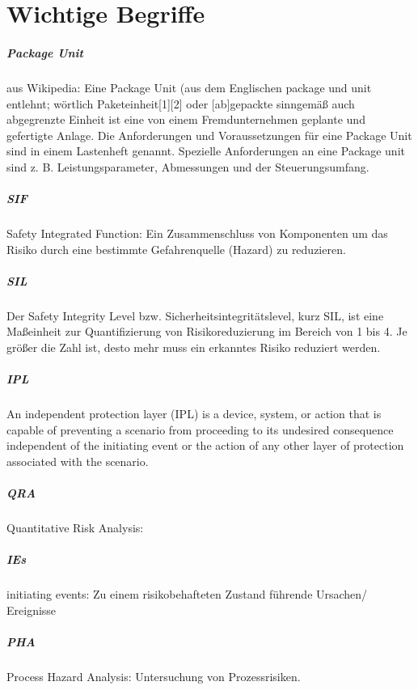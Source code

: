 \chapter{Wichtige Begriffe}
\paragraph*{Package Unit}
aus Wikipedia: \hfill \newline
Eine Package Unit (aus dem Englischen package und unit entlehnt; wörtlich Paketeinheit[1][2] oder [ab]gepackte sinngemäß auch abgegrenzte Einheit ist eine von einem Fremdunternehmen geplante und gefertigte Anlage. Die Anforderungen und Voraussetzungen für eine Package Unit sind in einem Lastenheft genannt. Spezielle Anforderungen an eine Package unit sind z. B. Leistungsparameter, Abmessungen und der Steuerungsumfang.
\paragraph*{SIF}
Safety Integrated Function: Ein Zusammenschluss von Komponenten um das Risiko durch eine bestimmte Gefahrenquelle (Hazard) zu reduzieren. 
\paragraph*{SIL}
Der Safety Integrity Level bzw. Sicherheitsintegritätslevel, kurz SIL, ist eine Ma\ss{}einheit zur Quantifizierung von Risikoreduzierung im Bereich von 1 bis 4. Je gr\"o\ss{}er die Zahl ist, desto mehr muss ein erkanntes Risiko reduziert werden. 
\paragraph*{IPL}
An independent protection layer (IPL) is a device, system, or action that is capable
of preventing a scenario from proceeding to its undesired consequence independent
of the initiating event or the action of any other layer of protection associated with
the scenario.
\paragraph*{QRA} Quantitative Risk Analysis: 
\paragraph*{IEs} initiating events: Zu einem risikobehafteten Zustand f\"uhrende Ursachen/ Ereignisse

\paragraph*{PHA} Process Hazard Analysis: Untersuchung von Prozessrisiken. 